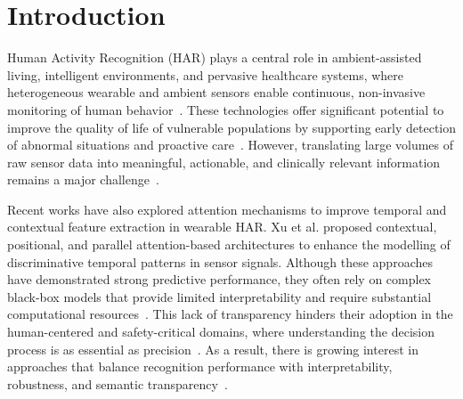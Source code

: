 \documentclass[preprint,12pt]{elsarticle}
\begin{document}
\section{Introduction}

Human Activity Recognition (HAR) plays a central role in ambient-assisted living, intelligent environments, and pervasive healthcare systems, where heterogeneous wearable and ambient sensors enable continuous, non-invasive monitoring of human behavior~\cite{wang2024application}. These technologies offer significant potential to improve the quality of life of vulnerable populations by supporting early detection of abnormal situations and proactive care~\cite{rehan2024enhancing}. However, translating large volumes of raw sensor data into meaningful, actionable, and clinically relevant information remains a major challenge~\cite{rehman2022leveraging}.

Recent works have also explored attention mechanisms to improve temporal and contextual feature extraction in wearable HAR. Xu et al. \cite{xu2024parallel,xu2023enhanced,xu2022shallow} proposed contextual, positional, and parallel attention-based architectures to enhance the modelling of discriminative temporal patterns in sensor signals. Although these approaches have demonstrated strong predictive performance, they often rely on complex black-box models that provide limited interpretability and require substantial computational resources~\cite{cruciani2019comparing}. This lack of transparency hinders their adoption in the human-centered and safety-critical domains, where understanding the decision process is as essential as precision~\cite{cao2024fuzzy}. As a result, there is growing interest in approaches that balance recognition performance with interpretability, robustness, and semantic transparency~\cite{alharthi2025explainable}.
\end{document}

